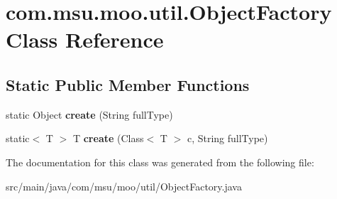 \hypertarget{classcom_1_1msu_1_1moo_1_1util_1_1ObjectFactory}{\section{com.\-msu.\-moo.\-util.\-Object\-Factory Class Reference}
\label{classcom_1_1msu_1_1moo_1_1util_1_1ObjectFactory}
}
\subsection*{Static Public Member Functions}
\begin{DoxyCompactItemize}
\item 
\hypertarget{classcom_1_1msu_1_1moo_1_1util_1_1ObjectFactory_a9435fa07dcde54aae15c1db8678dc24b}{static Object {\bfseries create} (String full\-Type)}\label{classcom_1_1msu_1_1moo_1_1util_1_1ObjectFactory_a9435fa07dcde54aae15c1db8678dc24b}

\item 
\hypertarget{classcom_1_1msu_1_1moo_1_1util_1_1ObjectFactory_a1d34f28e06e1e7427be270b72a0c53ae}{static$<$ T $>$ T {\bfseries create} (Class$<$ T $>$ c, String full\-Type)}\label{classcom_1_1msu_1_1moo_1_1util_1_1ObjectFactory_a1d34f28e06e1e7427be270b72a0c53ae}

\end{DoxyCompactItemize}


The documentation for this class was generated from the following file\-:\begin{DoxyCompactItemize}
\item 
src/main/java/com/msu/moo/util/Object\-Factory.\-java\end{DoxyCompactItemize}
